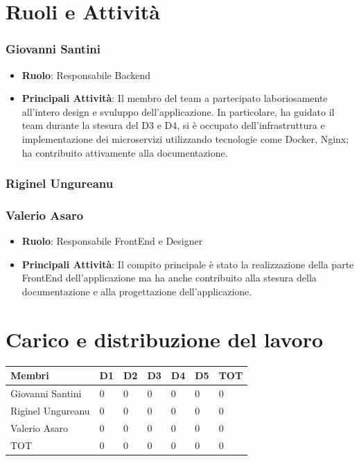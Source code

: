\documentclass{report}
\begin{document}
\section{Ruoli e Attività}

\subsubsection{Giovanni Santini}
\begin{itemize}
	\item \textbf{Ruolo}: Responsabile Backend
	\item \textbf{Principali Attività}: Il membro del team a partecipato laboriosamente all'intero design e svuluppo dell'applicazione. In particolare, ha guidato il team durante la stesura del D3 e D4, si è occupato dell'infrastruttura e implementazione dei microservizi utilizzando tecnologie come Docker, Nginx; ha contribuito attivamente alla documentazione.
\end{itemize}

\subsubsection{Riginel Ungureanu}

\subsubsection{Valerio Asaro}
\begin{itemize}
	\item \textbf{Ruolo}: Responsabile FrontEnd e Designer
	\item \textbf{Principali Attività}: Il compito principale è stato la realizzazione della parte FrontEnd dell'applicazione ma ha anche contribuito alla stesura della documentazione e alla progettazione dell'applicazione.
\end{itemize}

\section{Carico e distribuzione del lavoro}
\begin{center} %
	\centering
	\begin{tabular}{ |p{3cm}|p{1cm}|p{1cm}|p{1cm}|p{1cm}|p{1cm}|p{1cm}|  }
		\hline
		\centering  Membri  &  D1 &  D2 & D3 & D4 & D5 & TOT\\ %
		\hline
		\centering Giovanni Santini & 0 & 0 & 0 & 0 & 0 & 0 \\
		\hline
		\centering Riginel Ungureanu & 0 & 0 & 0 & 0 & 0 & 0 \\
		\hline
		\centering Valerio Asaro & 0 & 0 & 0 & 0 & 0 & 0 \\
		\hline
		\centering TOT & 0 & 0 & 0 & 0 & 0 & 0 \\
		\hline
	\end{tabular}
\end{center}
\end{document}
